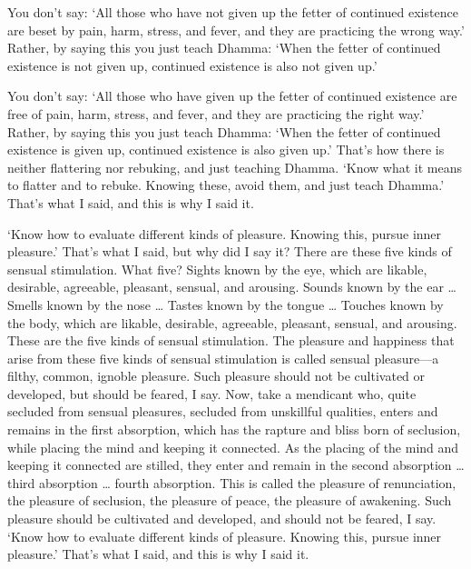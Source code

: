 \documentclass[12pt,openany]{book}%
\begin{document}
You don’t say: ‘All those who have not given up the fetter of continued existence are beset by pain, harm, stress, and fever, and they are practicing the wrong way.’ Rather, by saying this you just teach Dhamma: ‘When the fetter of continued existence is not given up, continued existence is also not given up.’ 

You don’t say: ‘All those who have given up the fetter of continued existence are free of pain, harm, stress, and fever, and they are practicing the right way.’ Rather, by saying this you just teach Dhamma: ‘When the fetter of continued existence is given up, continued existence is also given up.’ That’s how there is neither flattering nor rebuking, and just teaching Dhamma. ‘Know what it means to flatter and to rebuke. Knowing these, avoid them, and just teach Dhamma.’ That’s what I said, and this is why I said it. 

‘Know how to evaluate different kinds of pleasure. Knowing this, pursue inner pleasure.’ That’s what I said, but why did I say it? There are these five kinds of sensual stimulation. What five? Sights known by the eye, which are likable, desirable, agreeable, pleasant, sensual, and arousing. Sounds known by the ear … Smells known by the nose … Tastes known by the tongue … Touches known by the body, which are likable, desirable, agreeable, pleasant, sensual, and arousing. These are the five kinds of sensual stimulation. The pleasure and happiness that arise from these five kinds of sensual stimulation is called sensual pleasure—a filthy, common, ignoble pleasure. Such pleasure should not be cultivated or developed, but should be feared, I say. Now, take a mendicant who, quite secluded from sensual pleasures, secluded from unskillful qualities, enters and remains in the first absorption, which has the rapture and bliss born of seclusion, while placing the mind and keeping it connected. As the placing of the mind and keeping it connected are stilled, they enter and remain in the second absorption … third absorption … fourth absorption. This is called the pleasure of renunciation, the pleasure of seclusion, the pleasure of peace, the pleasure of awakening. Such pleasure should be cultivated and developed, and should not be feared, I say. ‘Know how to evaluate different kinds of pleasure. Knowing this, pursue inner pleasure.’ That’s what I said, and this is why I said it. 
\end{document}
